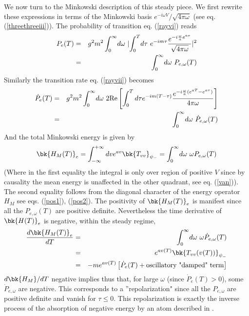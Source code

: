 \documentclass[12pt]{article}
\begin{document}
We now turn to the Minkowski description of this steady piece.
We first rewrite these expressions in terms of the Minkowski
basis $e^{-i\omega V}/\sqrt{4 \pi \omega}$ (see eq. (\ref{threethreeiii})). The
probability of
transition eq. (\ref{rayvi})
reads
 \begin{eqnarray} P_{e}(T) &=&
g^2 m^2 \int_0^\infty\! d\omega \ \vert\! \int_0^T\! d\tau\ e^{-im\tau} {
e^{-i{\omega \over a} e^{a \tau}} \over \sqrt{4 \pi \omega}} \vert^2
\nonumber\\ &=& \int_0^\infty\! d \omega\ P_{e,\omega}(T)
\label{rayix}
\end{eqnarray}
Similarly the transition rate eq. (\ref{rayvii}) becomes
\begin{eqnarray} \dot P_{e}(T)
 &=& g^2
m^2 \int_0^\infty\! d\omega \ 2 \mbox{Re} \left[ \int_0^T d\tau e^{-im(T-\tau)}
{ e^{-i{\omega \over a} (e^{aT} - e^{a \tau})} \over 4 \pi \omega} \right]
\nonumber\\ &=& \int_0^\infty \! d\omega\  \dot P_{e,\omega}(T)
\label{rayx}
\end{eqnarray}
And the total Minkowski energy is given by
 \begin{eqnarray}
\bk{H_M(T)}_{e} =
\int_{-\infty}^{+\infty} dv e^{av} \bk{T_{vv}}_{\psi_-}
= \int_0^\infty\! d\omega\ \omega P_{e, \omega}(T)
\label{rayxi}
\end{eqnarray}
(Where in the first equality the integral is only over region of positive $V$
since by causality the mean energy is unaffected in the other quadrant,
see eq. (\ref{van})).
The
second equality follows from the diagonal character of the energy operator
$H_M$
see eqs. (\ref{pos1}), (\ref{pos2}).
The positivity of
$\bk{H_M(T)}_{e}$
is manifest since
all the $P_{e,\omega}(T)$
are
positive definite. Nevertheless the time derivative of $\bk{H(T)}_{e}$
is negative, within the steady regime,
\begin{eqnarray}
{d\bk{H_M(T)}_{e} \over dT} &=& \int_0^\infty\! d\omega\ \omega
\dot P_{e,\omega}(T)\nonumber\\ &=& e^{a v(T)} \bk{T_{vv}(v(T))}_{\psi_-}
\nonumber\\
&=& -m e^{av(T)}  \left[ \dot P_{e} (T) + \hbox{oscillatory "damped" term}
 \right]
\label{rayxii}
\end{eqnarray}
${d\bk{H_M} / dT}$
negative implies thus that,
for large $ \omega$ (since $ \dot P_e(T) >0$), some $\dot P_{e,\omega}$
are negative. This
corresponds to a ''repolarization" since all the $P_{e,\omega}$
are positive definite
and vanish for $\tau \leq 0$. This repolarization is
exactly the inverse process of the absorption of negative energy by an atom
described in \cite{Grove2}.
\end{document}
